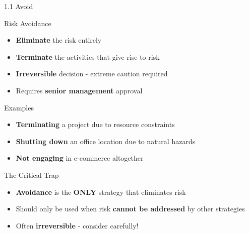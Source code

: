 \documentclass{beamer}
\begin{document}
	\begin{frame}{1.1 Avoid}
		\begin{block}{Risk Avoidance}
			\begin{itemize}
				\item \textbf{Eliminate} the risk entirely
				\item \textbf{Terminate} the activities that give rise to risk
				\item \textbf{Irreversible} decision - extreme caution required
				\item Requires \textbf{senior management} approval
			\end{itemize}
		\end{block}
		
		\begin{block}{Examples}
			\begin{itemize}
				\item \textbf{Terminating} a project due to resource constraints
				\item \textbf{Shutting down} an office location due to natural hazards
				\item \textbf{Not engaging} in e-commerce altogether
			\end{itemize}
		\end{block}
		
		\begin{alertblock}{The Critical Trap}
			\begin{itemize}
				\item \textbf{Avoidance} is the \textbf{ONLY} strategy that eliminates risk
				\item Should only be used when risk \textbf{cannot be addressed} by other strategies
				\item Often \textbf{irreversible} - consider carefully!
			\end{itemize}
		\end{alertblock}
	\end{frame}
	
\end{document}
